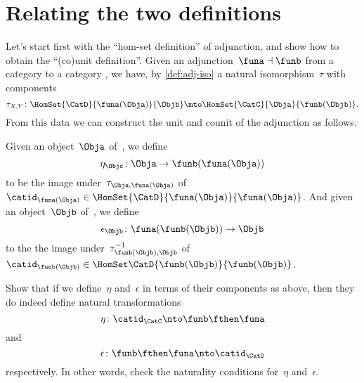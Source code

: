 
\section{Relating the two definitions}
\label{relate-adj-defs}

Let's start first with the ``hom-set definition'' of adjunction, and show how to obtain the ``(co)unit definition''.
Given an adjunction~$\funa \dashv \funb$ from a category \CatC to a category \CatD, we have, by \cref{def:adj-iso} a natural isomorphism~$\tau$ with components
\begin{equation*}
	\tau_{X,Y} \colon \HomSet{\CatD}{\funa(\Obja)}{\Objb} \mto \HomSet{\CatC}{\Obja}{\funb(\Objb)}.
\end{equation*}
From this data we can construct the unit and counit of the adjunction as follows.

Given an object~$\Obja$ of~\CatC, we define
\begin{equation*}
	\eta_\Objc \colon \Obja \to \funb(\funa(\Obja))
\end{equation*}
to be the image under~$\tau_{\Obja, \funa(\Obja)}$ of~$\catid_{\funa(\Obja)} \in \HomSet{\CatD}{\funa (\Obja)}{\funa(\Obja)}$.
And given an object~$\Objb$ of~\CatD, we define
\begin{equation*}
	\epsilon_\Objb \colon \funa(\funb(\Objb)) \to \Objb
\end{equation*}
to the the image under~$\tau_{\funb(\Objb), \Objb}^{-1}$ of~$\catid_{\funb(\Objb)} \in \HomSet\CatD{\funb(\Objb)}{\funb(\Objb)}$.

\begin{exercise}
	\label{ex:eta-epsilon}

	Show that if we define~$\eta$ and~$\epsilon$ in terms of their components as above, then they do indeed define natural transformations
	\begin{equation*}
		\eta\colon \catid_{\CatC} \nto \funb\fthen \funa
	\end{equation*}
	and
	\begin{equation*}
		\epsilon\colon \funb \fthen \funa \nto \catid_{\CatD}
	\end{equation*}
	respectively.
	In other words, check the naturality conditions for~$\eta$ and~$\epsilon$.
\end{exercise}
\begin{solution}
	\missingsolution
\end{solution}

